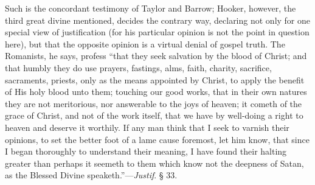 Such is the concordant testimony of Taylor and Barrow; Hooker,
however, the third great divine mentioned, decides the contrary way,
declaring not only for one special view of justification (for his
particular opinion is not the point in question here), but that the
opposite opinion is a virtual denial of gospel truth. The Romanists,
he says, profess ``that they seek salvation by the blood of Christ; and
that humbly they do use prayers, fastings, alms, faith, charity,
sacrifice, sacraments, priests, only as the means appointed by Christ,
to apply the benefit of His holy blood unto them; touching our good
works, that in their own natures they are not meritorious, nor
answerable to the joys of heaven; it cometh of the grace of Christ,
and not of the work itself, that we have by well-doing a right to
heaven and deserve it worthily. If any man think that I seek to
varnish their opinions, to set the better foot of a lame cause
foremost, let him know, that since I began thoroughly to understand
their meaning, I have found their halting greater than perhaps it
seemeth to them which know not the deepness of Satan, as the Blessed
Divine speaketh.''—\emph{Justif}. § 33.

